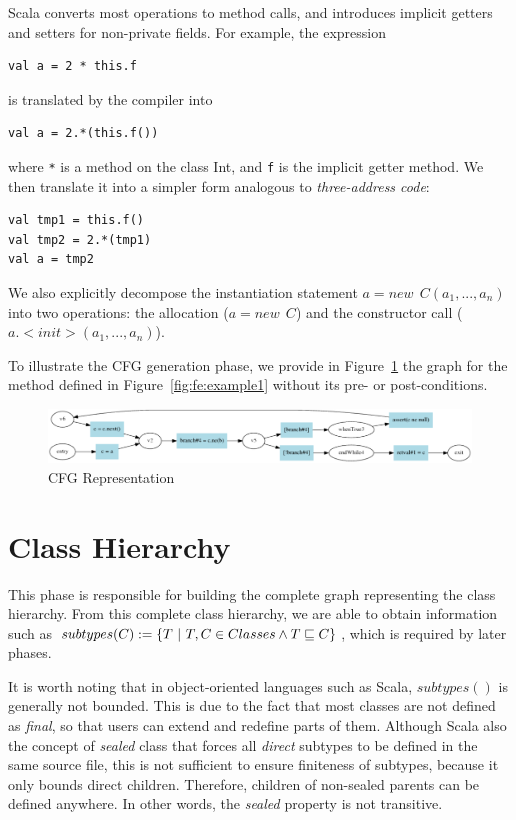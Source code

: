 Scala converts most operations to method calls, and introduces implicit getters
and setters for non-private fields. For example, the expression 
\begin{lstlisting}
val a = 2 * this.f
\end{lstlisting}
is translated by the compiler into 
\begin{lstlisting}
val a = 2.*(this.f())
\end{lstlisting}
where \lstinline{*} is a method on the class Int, and \lstinline{f} is the implicit
getter method. We then translate it into a simpler form analogous to
\emph{three-address code}:
\begin{lstlisting}
val tmp1 = this.f()
val tmp2 = 2.*(tmp1)
val a = tmp2
\end{lstlisting}

We also explicitly decompose the instantiation statement $a = new~~ C(a_1, ...,
a_n)$ into two operations: the allocation ($a = new~~ C$) and the constructor
call ($a.<init>(a_1, ..., a_n)$).

To illustrate the CFG generation phase, we provide in
Figure~\ref{fig:cfg:example1} the graph for the method defined in
Figure~\ref{fig:fe:example1} without its pre- or post-conditions.

\begin{figure}[h]
    \centering

    \includegraphics[scale=0.40]{images/cfg_example1} %

    \caption{CFG Representation}
    \label{fig:cfg:example1}
\end{figure}

\section{Class Hierarchy}
This phase is responsible for building the complete graph representing the
class hierarchy. From this complete class hierarchy, we are able to obtain
information such as $subtypes(C) := \{ T ~|~ T,C \in Classes \land T \sqsubseteq
C \}$, which is required by later phases.

It is worth noting that in object-oriented languages such as Scala,
$subtypes()$ is generally not bounded. This is due to the fact that most
classes are not defined as \emph{final}, so that users can extend and redefine
parts of them. Although Scala also the concept of \emph{sealed} class that forces
all \emph{direct} subtypes to be defined in the same source file, this 
is not sufficient to ensure finiteness of subtypes, because it only bounds
direct children. Therefore, children of non-sealed parents can be defined
anywhere. In other words, the \emph{sealed} property is not transitive.

